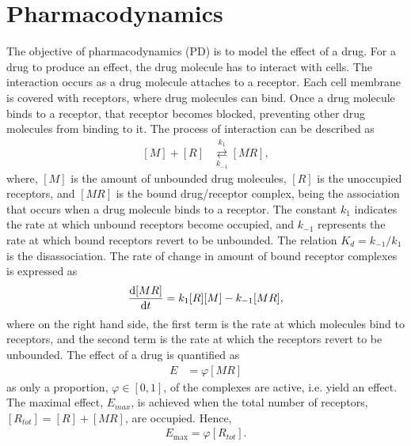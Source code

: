 \section{Pharmacodynamics} \label{sec: Pharmacodynamics}
The objective of pharmacodynamics (PD) is to model the effect of a drug. For a drug to produce an effect, the drug molecule has to interact with cells. The interaction occurs as a drug molecule attaches to a receptor. Each cell membrane is covered with receptors, where drug molecules can bind. Once a drug molecule binds to a receptor, that receptor becomes blocked, preventing other drug molecules from binding to it. The process of interaction can be described as
\begin{align} \label{eq: Reversible receptor}
    [M] + [R] & \overset{k_1}{\underset{k_{-1}}{\rightleftarrows}} [MR],
\end{align}
where, $[M]$ is the amount of unbounded drug molecules, $[R]$ is the unoccupied receptors, and $[MR]$ is the bound drug/receptor complex, being the association that occurs when a drug molecule binds to a receptor. The constant $k_1$ indicates the rate at which unbound receptors become occupied, and $k_{-1}$ represents the rate at which bound receptors revert to be unbounded. The relation $K_d = k_{-1}/k_1$ is the disassociation.
The rate of change in amount of bound receptor complexes is expressed as
\begin{align} \label{eq: steady state PD}
    \frac{\mathrm{d} [MR]}{\mathrm{d}t} = k_1 [R][M] - k_{-1}[MR],
\end{align}
where on the right hand side, the first term is the rate at which molecules bind to receptors, and the second term is the rate at which the receptors revert to be unbounded. 
The effect of a drug is quantified as 
\begin{align} 
    E &= \varphi[MR] \label{eq: effect formalisation}
\end{align}
as only a proportion, $\varphi \in [0, 1]$, of the complexes are active, i.e. yield an effect.
The maximal effect, $E_{max}$, is achieved when the total number of receptors, $[R_{tot}] = [R] + [MR]$, are occupied. Hence,
\begin{align}
    E_{\text{max}} = \varphi[R_{tot}]. \label{eq: effect formalisation2}
\end{align}

